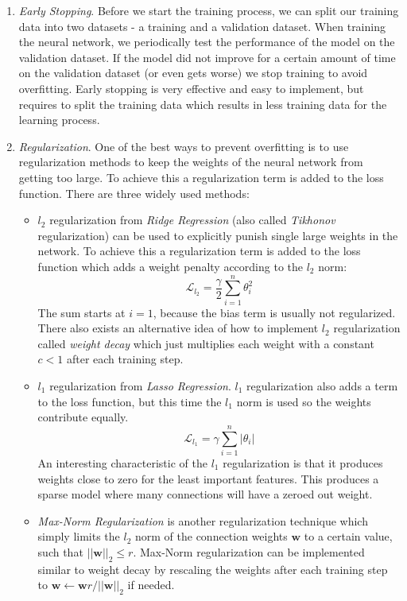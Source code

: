 \begin{enumerate}
  \item \textit{Early Stopping}. Before we start the training process, we can split our training data into two datasets - a training and a validation dataset. When training the neural network, we periodically test the performance of the model on the validation dataset. If the model did not improve for a certain amount of time on the validation dataset (or even gets worse) we stop training to avoid overfitting. Early stopping is very effective and easy to implement, but requires to split the training data which results in less training data for the learning process.  
  \item \textit{Regularization}. One of the best ways to prevent overfitting is to use regularization methods to keep the weights of the neural network from getting too large. To achieve this a regularization term is added to the loss function. There are three widely used methods:
  \begin{itemize}
    \item $l_2$ regularization from \textit{Ridge Regression} (also called \textit{Tikhonov} regularization) can be used to explicitly punish single large weights in the network. To achieve this a regularization term is added to the loss function which adds a weight penalty according to the $l_2$ norm:
      \[\mathcal{L}_{l_2} = \frac{\gamma}{2} \sum_{i=1}^n \theta^2_i \]
      The sum starts at $i=1$, because the bias term is usually not regularized. There also exists an alternative idea of how to implement $l_2$ regularization called \textit{weight decay} which just multiplies each weight with a constant $c < 1$ after each training step.
    
    \item $l_1$ regularization from \textit{Lasso Regression}. $l_1$ regularization also adds a term to the loss function, but this time the $l_1$ norm is used so the weights contribute equally. 
      \[\mathcal{L}_{l_1} = \gamma \sum_{i=1}^n |\theta_i| \]
      An interesting characteristic of the $l_1$ regularization is that it produces weights close to zero for the least important features. This produces a sparse model where many connections will have a zeroed out weight.
    
    \item \textit{Max-Norm Regularization} is another regularization technique which simply limits the $l_2$ norm of the connection weights $\mathbf{w}$ to a certain value, such that $|| \mathbf{w} ||_2 \leq r$. Max-Norm regularization can be implemented similar to weight decay by rescaling the weights after each training step to $\mathbf{w} \leftarrow \mathbf{w} r/||\mathbf{w}||_2$ if needed. 


\end{itemize}
\end{enumerate}

